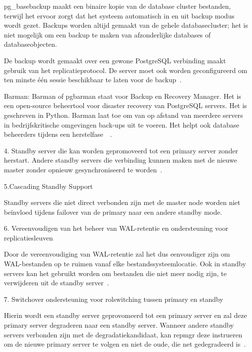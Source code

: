 pg\_basebackup maakt een binaire kopie van de database cluster bestanden, terwijl het ervoor zorgt dat het systeem automatisch in en uit backup modus wordt gezet. Backups worden altijd gemaakt van de gehele databasecluster; het is niet mogelijk om een backup te maken van afzonderlijke databases of databaseobjecten. 

De backup wordt gemaakt over een gewone PostgreSQL verbinding maakt gebruik van het replicatieprotocol. De server moet ook worden geconfigureerd om ten minste één sessie beschikbaar te laten voor de backup~\autocite{PostgreSQL2021c}. %

Barman: Barman of pgbarman staat voor Backup en Recovery Manager. Het is een open-source beheertool voor disaster recovery van PostgreSQL servers. Het is geschreven in Python. Barman laat toe om van op afstand van meerdere servers in bedrijfskritische omgevingen back-ups uit te voeren. Het helpt ook database beheerders tijdens een herstelfase~\autocite{Barman2020}~\autocite{Barman2020a}. %

4. Standby server die kan worden gepromoveerd tot een primary server zonder herstart. Andere standby servers die verbinding kunnen maken met de nieuwe master zonder opnieuw gesynchroniseerd te worden~\autocite{2020a}.

5.Cascading Standby Support

Standby servers die niet direct verbonden zijn met de master node worden niet beïnvloed tijdens failover van de primary naar een andere standby mode.

6. Vereenvoudigen van het beheer van WAL-retentie en ondersteuning voor replicatiesleuven

Door de vereenvoudiging van WAL-retentie zal het dus eenvoudiger zijn om WAL-bestanden op te ruimen vanaf elke bestandssysteemlocatie. Ook in standby servers kan het gebruikt worden om bestanden die niet meer nodig zijn, te verwijderen uit de standby server~\autocite{Augustine2019}.

7. Switchover ondersteuning voor rolswitching tussen primary en standby

Hierin wordt een standby server geprovomeerd tot een primary server en zal deze primary server degraderen naar een standby server. Wanneer andere standby servers verbonden zijn met de degradatiekandidaat, kan repmgr deze instrueren om de nieuwe primary server te volgen en niet de oude, die net gedegradeerd is~\autocite{2021b}. %

